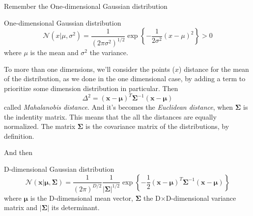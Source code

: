\begin{frame}{\insertsubsection}

Remember the One-dimensional Gaussian distribution
\begin{block}{One-dimensional Gaussian distribution}
\begin{equation*}
	\mathcal{N}(x | \mu, \sigma^2) = \frac{1}{(2 \pi \sigma^2)^{1/2}} \exp \left\{ -\frac{1}{2 \sigma^2} (x- \mu)^2 \right\} > 0
\end{equation*}
where $\mu$ is the mean and $\sigma^2$ the variance.
\end{block}
\end{frame}

\begin{frame}{\insertsubsection}
	To more than one dimensions, we'll consider the points ($x$) distance for the mean of the distribution, as we done in the one dimensional case, by adding a term to prioritize some dimension distribution in particular. Then
	\begin{equation*}
		\Delta^2 = (\mathbf{x} - \boldsymbol{\mu})^T \boldsymbol{\Sigma} ^{-1} (\mathbf{x} - \boldsymbol{\mu}) 
	\end{equation*}
called \textit{Mahalanobis distance}. And it's becomes the \textit{Euclidean distance}, when $\boldsymbol{\Sigma}$ is the indentity matrix. This means that the all the distances are equally normalized. The matrix $\boldsymbol{\Sigma}$ is the covariance matrix of the distributions, by definition.
\end{frame}

\begin{frame}{\insertsubsection}
And then
\begin{block}{D-dimensional Gaussian distribution}
\begin{equation*}
	\mathcal{N}(\mathbf{x} | \boldsymbol{\mu}, \boldsymbol{\Sigma}) = \frac{1}{(2 \pi )^{D/2}} \frac{1}{|\boldsymbol{\Sigma}|^{1/2}} \exp \left\{ -\frac{1}{2} (\mathbf{x} - \boldsymbol{\mu})^T \boldsymbol{\Sigma} ^{-1} (\mathbf{x} - \boldsymbol{\mu})  \right\} 
\end{equation*}
where $\boldsymbol{\mu}$ is the D-dimensional mean vector, $\boldsymbol{\Sigma}$ the D$\times$D-dimensional variance matrix and $|\boldsymbol{\Sigma}|$ its determinant.
\end{block}
\end{frame}

